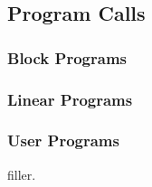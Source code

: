 \documentclass[twoside]{article}
\begin{document}
\subsection*{Program Calls}

\subsubsection*{Block Programs}

\subsubsection*{Linear Programs}

\subsubsection*{User Programs}

\newpage

filler.
\end{document}
